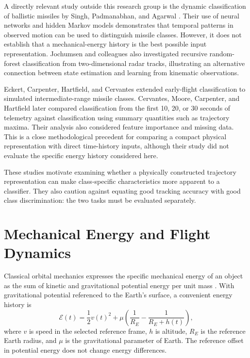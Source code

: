 A directly relevant study outside this research group is the dynamic
classification of ballistic missiles by Singh, Padmanabhan, and
Agarwal \cite{singh2014dynamic}.
Their use of neural networks and hidden Markov models demonstrates that
temporal patterns in observed motion can be used to distinguish missile
classes. However, it does not establish that a mechanical-energy history
is the best possible input representation. Jochumsen and colleagues
\cite{jochumsen2016recursive} also investigated recursive
random-forest classification from two-dimensional radar tracks,
illustrating an alternative connection between state estimation
and learning from kinematic observations.

Eckert, Carpenter, Hartfield, and Cervantes
\cite{eckert2020classification} extended early-flight classification
to simulated intermediate-range missile classes. Cervantes,
Moore, Carpenter, and Hartfield \cite{cervantes2024telemetry}
later compared classification from the first 10, 20, or 30 seconds
of telemetry against classification using summary quantities
such as trajectory maxima. Their analysis also considered feature
importance and missing data. This is a close methodological
precedent for comparing a compact physical representation
with direct time-history inputs, although their study did not
evaluate the specific energy history considered here.

These studies motivate examining whether a physically constructed
trajectory representation can make class-specific characteristics
more apparent to a classifier. They also caution against equating
good tracking accuracy with good class discrimination: the two tasks
must be evaluated separately.

\section{Mechanical Energy and Flight Dynamics}
\label{sec:lit-energy}

Classical orbital mechanics expresses the specific mechanical energy
of an object as the sum of kinetic and gravitational potential energy
per unit mass \cite{curtis2021orbital}. With gravitational potential
referenced to the Earth's surface, a convenient energy history is
\begin{equation}
    \mathcal{E}(t)
    = \frac{1}{2}v(t)^2
    + \mu\left(
        \frac{1}{R_E} - \frac{1}{R_E+h(t)}
      \right),
    \label{eq:lit-specific-energy}
\end{equation}
where $v$ is speed in the selected reference frame, $h$ is altitude,
$R_E$ is the reference Earth radius, and $\mu$ is the gravitational
parameter of Earth. The reference offset in potential energy does
not change energy differences.

